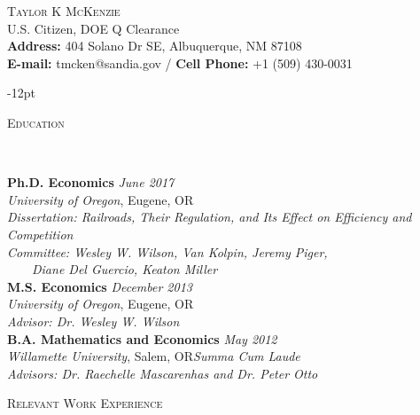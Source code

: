 \documentclass[11pt]{article}
\newenvironment{changemargin}[2]{%
  \begin{list}{}{%
    \setlength{\topsep}{0pt}%
    \setlength{\leftmargin}{#1}%
    \setlength{\rightmargin}{#2}%
    \setlength{\listparindent}{\parindent}%
    \setlength{\itemindent}{\parindent}%
    \setlength{\parsep}{\parskip}%
  }%
  \item[]}{\end{list}
}
\newcommand{\lineover}{
	\begin{changemargin}{-0.05in}{-0.05in}
		\vspace*{-8pt}
		\hrulefill \\
		\vspace*{-2pt}
	\end{changemargin}
}
\newcommand{\header}[1]{
	\begin{changemargin}{-0.5in}{-0.5in}
		\scshape{#1}\\
	\vspace*{-5pt}
  	\lineover
	\end{changemargin}
}
\newcommand{\contact}[4]{
	\begin{changemargin}{-0.5in}{-0.5in}
		\begin{center}
			{\Large \scshape {#1}}\\ \smallskip
			{#2}\\ \smallskip 
			{#3}\\ \smallskip
			{#4}\smallskip
		\end{center}
	\end{changemargin}
}
\newenvironment{body} {
	\vspace*{-16pt}
	\begin{changemargin}{-0.25in}{-0.5in}
  }	
	{\end{changemargin}
}
\begin{document}



\contact{\vspace*{-5ex}Taylor K McKenzie}{U.S. Citizen, DOE Q Clearance\\ \textbf{Address:} 404 Solano Dr SE, Albuquerque, NM 87108}{\vspace*{-0.75ex}\textbf{E-mail:} tmcken@sandia.gov / \textbf{Cell Phone:} +1 (509) 430-0031}

\vspace{-12pt}
\header{Education}

\begin{body}
	\vspace{14pt}
	\textbf{Ph.D. Economics}{} \hfill \emph{June 2017}{} \\
	\emph{University of Oregon}, Eugene, OR{}\\
	\emph{Dissertation: Railroads, Their Regulation, and Its Effect on Efficiency and Competition}\\
	\emph{Committee: Wesley W. Wilson, Van Kolpin, Jeremy Piger,}\\
	\ \ \ \ \emph{Diane Del Guercio, Keaton Miller}\\
	\vspace*{0pt}
  \medskip
	\textbf{M.S. Economics}{} \hfill \emph{December 2013}{} \\
	\emph{University of Oregon}, Eugene, OR{}\\
	\emph{Advisor: Dr. Wesley W. Wilson} \\
	\vspace*{0pt}
  \medskip
  	\textbf{B.A. Mathematics and Economics}{} \hfill \emph{May 2012}{} \\
	\emph{Willamette University}, Salem, OR{}\hfill \emph{Summa Cum Laude}{}\\
	\emph{Advisors: Dr. Raechelle Mascarenhas and Dr. Peter Otto} {} \hfill\\
\end{body}
\smallskip
\header{Relevant Work Experience}
\end{document}
